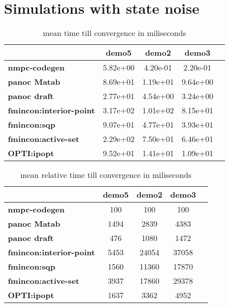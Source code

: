 \section{Simulations with state noise}
\begin{table}[H]
	\centering
	\begin{tabular}{|l|c|c|c|c|}
		\hline
		&\textbf{demo5}&\textbf{demo2}&\textbf{demo3}\\\hline
		\textbf{nmpc-codegen}&5.82e+00&4.20e-01&2.20e-01\\\hline
		\textbf{panoc Matab}&8.69e+01&1.19e+01&9.64e+00\\\hline
		\textbf{panoc draft}&2.77e+01&4.54e+00&3.24e+00\\\hline
		\textbf{fmincon:interior-point}&3.17e+02&1.01e+02&8.15e+01\\\hline
		\textbf{fmincon:sqp}&9.07e+01&4.77e+01&3.93e+01\\\hline
		\textbf{fmincon:active-set}&2.29e+02&7.50e+01&6.46e+01\\\hline
		\textbf{OPTI:ipopt}&9.52e+01&1.41e+01&1.09e+01\\\hline
	\end{tabular}
	\caption{mean time till convergence in miliseconds}
	\label{tbl:mean time till convergence with noise}
\end{table}

\begin{table}[H]
	\centering
	\begin{tabular}{|l|c|c|c|c|}
		\hline
		&\textbf{demo5}&\textbf{demo2}&\textbf{demo3}\\\hline
		\textbf{nmpc-codegen}&100&100&100\\\hline
		\textbf{panoc Matab}&1494&2839&4383\\\hline
		\textbf{panoc draft}&476&1080&1472\\\hline
		\textbf{fmincon:interior-point}&5453&24054&37058\\\hline
		\textbf{fmincon:sqp}&1560&11360&17870\\\hline
		\textbf{fmincon:active-set}&3937&17860&29378\\\hline
		\textbf{OPTI:ipopt}&1637&3362&4952\\\hline
	\end{tabular}
	\caption{mean relative time till convergence in miliseconds}
	\label{tbl:mean relative time till convergence with noise}
\end{table}

